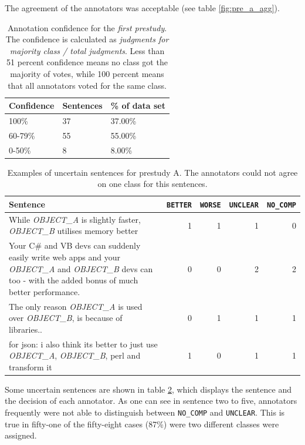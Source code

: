 The agreement of the annotators was acceptable (see table \ref{fig:pre_a_agg}).

\begin{table}[h]
\caption{Annotation confidence for the \emph{first prestudy}. The confidence is calculated as \emph{judgments for majority class / total judgments}. Less than 51 percent confidence means no class got the majority of votes, while 100 percent means that all annotators voted for the same class.}
\label{fig:pre_b_agg}
\begin{tabularx}{\textwidth}{XXX}
\toprule
Confidence & Sentences & \% of data set \\
\midrule
100\%	&	37	&	37.00\%	 \\ 
60-79\%	&	55	&	55.00\%	 \\ 
0-50\%	&	8	&	8.00\%	 \\ 
\bottomrule
\end{tabularx}
\end{table}


\begin{table}[h]
\centering
\caption{Examples of uncertain sentences for prestudy A. The annotators could not agree on one class for this sentences. }
\label{tbl:pre_1_res}
\begin{tabularx}{\textwidth}{Xrrrr}
\toprule
 Sentence        & \texttt{BETTER} & \texttt{WORSE} & \texttt{UNCLEAR} & \texttt{NO\_COMP}          \\ \midrule

While \emph{OBJECT\_A} is slightly faster, \emph{OBJECT\_B} utilises memory better & 1 & 1 & 1 & 0 \\

Your C\# and VB devs can suddenly easily write web apps and your \emph{OBJECT\_A} and \emph{OBJECT\_B} devs can too - with the added bonus of much better performance. & 0 & 0 & 2 & 2 \\

The only reason \emph{OBJECT\_A} is used over \emph{OBJECT\_B}, is because of libraries.. & 0 & 1 & 1 & 1 \\

for json: i also think its better to just use \emph{OBJECT\_A}, \emph{OBJECT\_B}, perl and transform it & 1 & 0 & 1 & 1 \\

\bottomrule                              
\end{tabularx}
\end{table}

Some uncertain sentences are shown in table \ref{tbl:pre_1_res}, which displays the sentence and the decision of each annotator. As one can see in sentence two to five, annotators frequently were not able to distinguish between \texttt{NO\_COMP} and \texttt{UNCLEAR}. This is true in fifty-one of the fifty-eight cases (87\%) were two different classes were assigned.\newline

